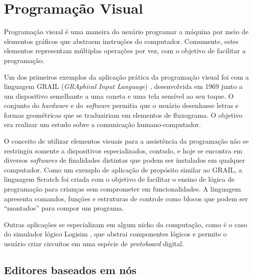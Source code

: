\documentclass[
	12pt,				%
	openright,			%
	oneside,			%
	a4paper,			%
	main=brazil,
	english,			%
	]{ufsj-abntex2}
\begin{document}


\section{Programação Visual}
\label{sec:programacao-visual}

Programação visual é uma maneira do usuário programar a máquina por meio de elementos gráficos que abstraem instruções do computador. Comumente, estes elementos representam múltiplas operações por vez, com o objetivo de facilitar a programação.

Um dos primeiros exemplos da aplicação prática da programação visual foi com a linguagem GRAIL (\textit{GRAphical Input Language}) \cite{grail}, desenvolvida em 1969 junto a um dispositivo semelhante a uma caneta e uma tela sensível ao seu toque. O conjunto do \textit{hardware} e do \textit{software} permitia que o usuário desenhasse letras e formas geométricas que se traduziriam em elementos de fluxograma. O objetivo era realizar um estudo sobre a comunicação humano-computador.

O conceito de utilizar elementos visuais para a assistência da programação não se restringiu somente a dispositivos especializados, contudo, e hoje se encontra em diversos \textit{softwares} de finalidades distintas que podem ser instalados em qualquer computador. Como um exemplo de aplicação de propósito similar ao GRAIL, a linguagem Scratch \cite{scratchlang} foi criada com o objetivo de facilitar o ensino de lógica de programação para crianças sem comprometer em funcionalidades. A linguagem apresenta comandos, funções e estruturas de controle como blocos que podem ser ``montados'' para compor um programa.

Outras aplicações se especializam em algum nicho da computação, como é o caso do simulador lógico Logisim \cite{logisim}, que abstrai componentes lógicos e permite o usuário criar circuitos em uma espécie de \textit{protoboard} digital.

\subsection{Editores baseados em nós}
\end{document}
